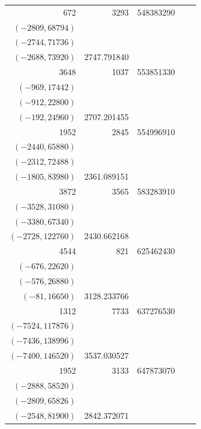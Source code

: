 \documentclass[11pt]{article}
\begin{document}
\begin{longtable}{r r r l r}
672 & 3293 & 548383290 & \begin{tabular}[t]{@{}l@{}}$(-3108,46620)$\\$(-2809,68794)$\\$(-2744,71736)$\\$(-2688,73920)$\end{tabular} & 2747.791840\\[5pt]
3648 & 1037 & 553851330 & \begin{tabular}[t]{@{}l@{}}$(-976,16592)$\\$(-969,17442)$\\$(-912,22800)$\\$(-192,24960)$\end{tabular} & 2707.201455\\[5pt]
1952 & 2845 & 554996910 & \begin{tabular}[t]{@{}l@{}}$(-2809,21942)$\\$(-2440,65880)$\\$(-2312,72488)$\\$(-1805,83980)$\end{tabular} & 2361.089151\\[5pt]
3872 & 3565 & 583283910 & \begin{tabular}[t]{@{}l@{}}$(-3564,5148)$\\$(-3528,31080)$\\$(-3380,67340)$\\$(-2728,122760)$\end{tabular} & 2430.662168\\[5pt]
4544 & 821 & 625462430 & \begin{tabular}[t]{@{}l@{}}$(-784,12432)$\\$(-676,22620)$\\$(-576,26880)$\\$(-81,16650)$\end{tabular} & 3128.233766\\[5pt]
1312 & 7733 & 637276530 & \begin{tabular}[t]{@{}l@{}}$(-7688,55800)$\\$(-7524,117876)$\\$(-7436,138996)$\\$(-7400,146520)$\end{tabular} & 3537.030527\\[5pt]
1952 & 3133 & 647873070 & \begin{tabular}[t]{@{}l@{}}$(-2989,46116)$\\$(-2888,58520)$\\$(-2809,65826)$\\$(-2548,81900)$\end{tabular} & 2842.372071\\[5pt]

\end{longtable}
\end{document}
